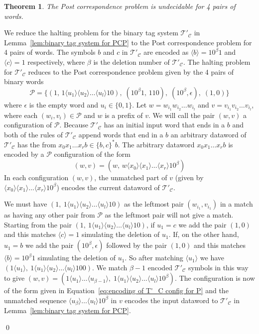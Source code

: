 \documentclass[11pt]{article} \usepackage{amsfonts,amsmath,amssymb,amsthm}
\renewenvironment{proof}{{\bfseries\noindent Proof.}}{\qed\vspace{3.5ex}}
\newtheorem{theorem}{Theorem}
\newcommand{\tne}[1]{\ensuremath{\langle #1\rangle}}
\newcommand{\PCPfour}{\mathcal{P}}\newcommand{\CTS}{\mathcal{C}}\newcommand{\CTSp}{\mathcal{C'}}\newcommand{\TSTC}{\mathcal{T_{\CTS}}}\newcommand{\TSTCp}{\mathcal{T'_{\CTS}}}\def\Nset{\mathbb{N}}\def\Zset{\mathbb{Z}}\def\Qset{\mathbb{Q}}
\begin{document}
\begin{theorem}\label{thm:PCP 4 is undecidable}
The Post correspondence problem is undecidable for 4 pairs of words. 
\end{theorem}
\begin{proof}
We reduce the halting problem for the binary tag system $\TSTCp$ in Lemma~\ref{lem:binary tag system for PCP} to the Post correspondence problem for 4 pairs of words. 
The symbols $b$ and $c$ in $\TSTCp$ are encoded as $\tne{b}=10^{\beta}1$ and $\tne{c}=1$ respectively, where $\beta$ is the deletion number of $\TSTCp$. 
The halting problem for $\TSTCp$ reduces to the Post correspondence problem given by the 4 pairs of binary words
\begin{equation*}\label{eq:undecidable PCP}
\PCPfour=\{(1,\,1\tne{u_1}\tne{u_2}\dots \tne{u_l}10),\;(10^{\beta}1,\,110),\;(10^{\beta},\epsilon),\;(1,0)\}
\end{equation*}
where $\epsilon$ is the empty word and $u_i\in\{0,1\}$. 
Let $w=w_{i_1}w_{i_2}\ldots w_{i_l}$ and $v=v_{i_1}v_{i_2}\ldots v_{i_l}$, where each $(w_{i},v_{i})\in\PCPfour$ and $w$ is a prefix of $v$. 
We will call the pair $(w,v)$ a configuration of $\PCPfour$. Because $\TSTCp$ has an initial input word that ends in a $b$ and both of the rules of $\TSTCp$ append words that end in a $b$ an arbitrary dataword of $\TSTCp$ has the from $x_0x_1\ldots x_{r}b\in\{b,c\}^\ast b$. The arbitrary dataword $x_0x_1\ldots x_{r}b$ is encoded by a $\PCPfour$ configuration of the form
\begin{equation}\label{eq:encoding of T'_C config for P}
(w,v)=(w,\,w\tne{x_0}\tne{x_1}\ldots\tne{x_{r}}10^{\beta})
\end{equation}
In each configuration $(w,v)$, the unmatched part of $v$ (given by $\tne{x_0}\tne{x_1}\ldots\tne{x_{r}}10^{\beta}$) encodes the current dataword of $\TSTCp$. 


We must have $(1,\:1\tne{u_1}\tne{u_2}\dots \tne{u_l}10)$ as the leftmost pair $(w_{i_1},v_{i_1})$ in a match as having any other pair from $\PCPfour$ as the leftmost pair will not give a match. 
Starting from the pair $(1,\:1\tne{u_1}\tne{u_2}\dots \tne{u_l}10)$, if $u_1=c$ we add the pair $(1,0)$ and this matches $\tne{c}=1$ simulating the deletion of $u_1$. 
If, on the other hand, $u_1=b$ we add the pair $(10^{\beta},\epsilon)$ followed by the pair $(1,0)$ and this matches $\tne{b}=10^{\beta}1$ simulating the deletion of $u_1$. 
So after matching $\tne{u_1}$ we have $(1\tne{u_1},\:1\tne{u_1}\tne{u_2}\dots \tne{u_l}100)$.
We match $\beta-1$ encoded $\TSTCp$ symbols in this way to give $(w,v)=(1\tne{u_1}\ldots\tne{u_{\beta-1}},\;1\tne{u_1}\tne{u_2}\dots \tne{u_l}10^{\beta})$. 
The configuration is now of the form given in Equation~\eqref{eq:encoding of T'_C config for P} and the unmatched sequence $\tne{u_{\beta}}\dots \tne{u_l}10^{\beta}$ in $v$ encodes the input dataword to $\TSTCp$ in Lemma~\ref{lem:binary tag system for PCP}. 



\end{proof}
\end{document}
